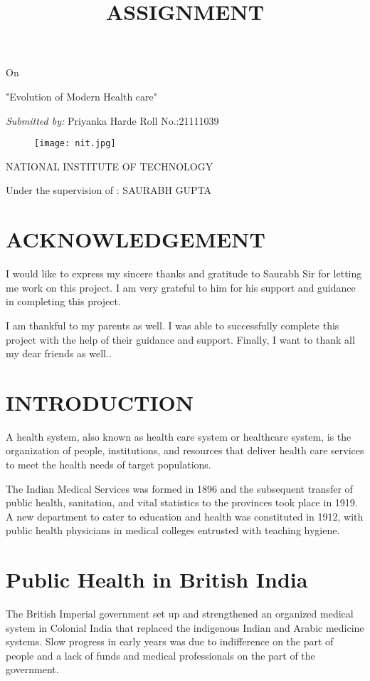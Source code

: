 \documentclass[11pt]{article}
\title{\Huge \textbf{ASSIGNMENT}}
\begin{document}
\maketitle
\centering On

\Huge "Evolution of Modern Health care"
\setlength{\parskip}{0.5em}

\emph{\large Submitted by:}
\large Priyanka Harde
\large Roll No.:21111039
\begin{figure}[h]
\begin{center}
\texttt{[image: nit.jpg]}
\end{center}
\end{figure}

\textsc{\Large NATIONAL INSTITUTE OF TECHNOLOGY}

\large Under the supervision of : SAURABH GUPTA 
\clearpage 
\tableofcontents
\clearpage
\section{\huge  ACKNOWLEDGEMENT}
\Large \raggedright I would like to express my sincere thanks and gratitude to Saurabh Sir for letting me work on this project. I am very grateful to him for his support and guidance in completing this project.

I am thankful to my parents as well. I was able to successfully complete this project with the help of their guidance and support. Finally, I want to thank all my dear friends as well..

\section{\textbf{\huge INTRODUCTION}}
\raggedright \Large A health system, also known as health care system or healthcare system, is the organization of people, institutions, and resources that deliver health care services to meet the health needs of target populations.

The Indian Medical Services was formed in 1896 and the subsequent transfer of public health, sanitation, and vital statistics to the provinces took place in 1919. A new department to cater to education and health was constituted in 1912, with public health physicians in medical colleges entrusted with teaching hygiene.
\section{\huge Public Health in British India}
The British Imperial government set up and strengthened an organized medical system in Colonial India that replaced the indigenous Indian and Arabic medicine systems. Slow progress in early years was due to indifference on the part of people and a lack of funds and medical professionals on the part of the government.
\end{document}
